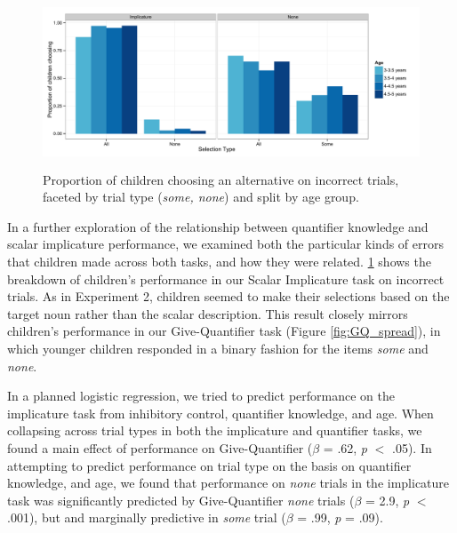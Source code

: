 \documentclass[man]{apa2}
\begin{document}
\begin{figure} 
 \begin{center} 
  \includegraphics[height=2in]{figures/exp3_wrong.pdf} 
  \caption{\label{fig:exp3_wrong} Proportion of children choosing an alternative on incorrect trials, faceted by trial type (\textit{some, none}) and split by age group.} 
 \end{center} 
\end{figure}

In a further exploration of the relationship between quantifier knowledge and scalar implicature performance, we examined both the particular kinds of errors that children made across both tasks, and how they were related. \ref{fig:exp3_wrong} shows the breakdown of children's performance in our Scalar Implicature task on incorrect trials. As in Experiment 2, children seemed to make their selections based on the target noun rather than the scalar description. This result closely mirrors children's performance in our Give-Quantifier task (Figure \ref{fig:GQ_spread}), in which younger children responded in a binary fashion for the items \textit{some} and \textit{none}. 

In a planned logistic regression, we tried to predict performance on the implicature task from inhibitory control, quantifier knowledge, and age. When collapsing across trial types in both the implicature and quantifier tasks, we found a main effect of performance on Give-Quantifier ($\beta$ = .62, \emph{p} $<$ .05). In attempting to predict performance on trial type on the basis on quantifier knowledge, and age, we found that performance on \emph{none} trials in the implicature task was significantly predicted by Give-Quantifier \emph{none} trials ($\beta$ = 2.9, \emph{p} $<$ .001), but and marginally predictive in \emph{some} trial ($\beta$ = .99, \emph{p} = .09). 
\end{document}
